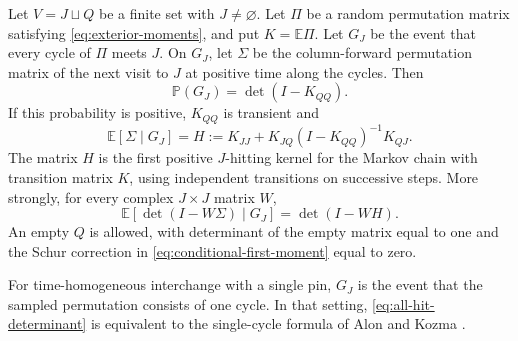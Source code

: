 \begin{proposition}
\label{prop:first-moment}
Let \(V=J\sqcup Q\) be a finite set with \(J\ne\varnothing\).
Let \(\Pi\) be a random permutation matrix satisfying
\eqref{eq:exterior-moments}, and put \(K=\mathbb E\Pi\).
Let \(G_J\) be the event that every cycle of \(\Pi\) meets \(J\).
On \(G_J\), let \(\Sigma\) be the column-forward permutation matrix
of the next visit to \(J\) at positive time along the cycles.  Then
\begin{equation}
 \mathbb P(G_J)=\det(I-K_{QQ}).
 \label{eq:all-hit-determinant}
\end{equation}
If this probability is positive, \(K_{QQ}\) is transient and
\begin{equation}
 \mathbb E[\Sigma\mid G_J]
   =H:=K_{JJ}+K_{JQ}(I-K_{QQ})^{-1}K_{QJ}.
 \label{eq:conditional-first-moment}
\end{equation}
The matrix \(H\) is the first positive \(J\)-hitting kernel for the
Markov chain with transition matrix \(K\), using independent transitions
on successive steps.  More strongly, for every complex \(J\times J\)
matrix \(W\),
\begin{equation}
 \mathbb E[\det(I-W\Sigma)\mid G_J]=\det(I-WH).
 \label{eq:arbitrary-W}
\end{equation}
An empty \(Q\) is allowed, with determinant of the empty matrix equal
to one and the Schur correction in \eqref{eq:conditional-first-moment}
equal to zero.
\end{proposition}

For time-homogeneous interchange with a single pin, \(G_J\) is the
event that the sampled permutation consists of one cycle.  In that
setting, \eqref{eq:all-hit-determinant} is equivalent to the
single-cycle formula of Alon and Kozma
\cite[Theorem~1]{AlonKozma2013LongCycles}.

